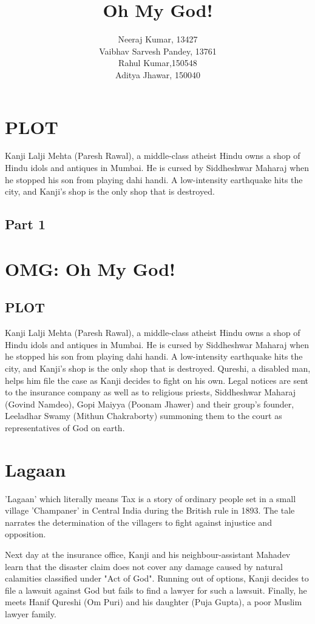 \documentclass[a4paper]{article}
\title{Oh My God! }
\author{Neeraj Kumar, 13427\\
	Vaibhav Sarvesh Pandey, 13761\\
Rahul Kumar,150548\\ 
	Aditya Jhawar, 150040}
\begin{document}
	\maketitle
	

	\section{PLOT}
Kanji Lalji Mehta (Paresh Rawal), a middle-class atheist Hindu owns a shop of Hindu idols and antiques in Mumbai. He is cursed by Siddheshwar Maharaj when he stopped his son from playing dahi handi. A low-intensity earthquake hits the city, and Kanji's shop is the only shop that is destroyed.	
	

	    \subsection{Part 1}
	\section{OMG: Oh My God! }
	
	\subsection{PLOT}
Kanji Lalji Mehta (Paresh Rawal), a middle-class atheist Hindu owns a shop of Hindu idols and antiques in Mumbai. He is cursed by Siddheshwar Maharaj when he stopped his son from playing dahi handi. A low-intensity earthquake hits the city, and Kanji's shop is the only shop that is destroyed. Qureshi, a disabled man, helps him file the case as Kanji decides to fight on his own. Legal notices are sent to the insurance company as well as to religious priests, Siddheshwar Maharaj (Govind Namdeo), Gopi Maiyya (Poonam Jhawer) and their group's founder, Leeladhar Swamy (Mithun Chakraborty) summoning them to the court as representatives of God on earth.
	
	
	
	  \section{Lagaan }
	  'Lagaan' which literally means Tax is a story of ordinary people set in a small village 'Champaner' in Central India during the British rule in 1893. The tale narrates the determination of the villagers to fight against injustice and opposition.

	    	        
	      Next day at the insurance office, Kanji and his neighbour-assistant Mahadev learn that the disaster claim does not cover any damage caused by natural calamities classified under "Act of God".   Running out of options, Kanji decides to file a lawsuit against God but fails to find a lawyer for such a lawsuit. Finally, he meets Hanif Qureshi (Om Puri) and his daughter (Puja Gupta), a poor Muslim lawyer family.
	            
\end{document}
